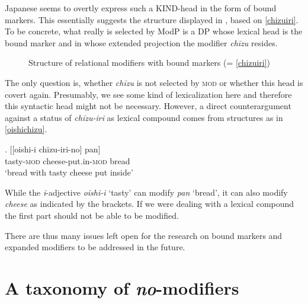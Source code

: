 Japanese seems to overtly express such a KIND-head in the form of bound markers. This essentially suggests the structure displayed in , based on \ref{chizuiri}. To be concrete, what really is selected by ModP is a DP whose lexical head is the bound marker and in whose extended projection the modifier \textit{chīzu} resides.

\begin{figure}
\centering
\caption{Structure of relational modifiers with bound markers (= \ref{chizuiri})}
\label{structure relational modifiers and bound markers}
\end{figure}

The only question is, whether \textit{chīzu} is not selected by \textsc{mod} or whether this head is covert again. Presumably, we see some kind of lexicalization here and therefore this syntactic head might not be necessary. However, a direct counterargument against a status of \textit{chīzu-iri} as lexical compound comes from structures as in \ref{oishichizu}. 

\exg. [[oishi-i chīzu-iri-no] pan]\\
tasty-\textsc{mod} cheese-put.in-\textsc{mod} bread\\
`bread with tasty cheese put inside' \label{oishichizu}

While the \textit{i}-adjective \textit{oishi-i} `tasty’ can modify \textit{pan} `bread’, it can also modify \textit{cheese} as indicated by the brackets. If we were dealing with a lexical compound the first part should not be able to be modified.

There are thus many issues left open for the research on bound markers and expanded modifiers to be addressed in the future.

\chapter{A taxonomy of \textit{no}-modifiers}

